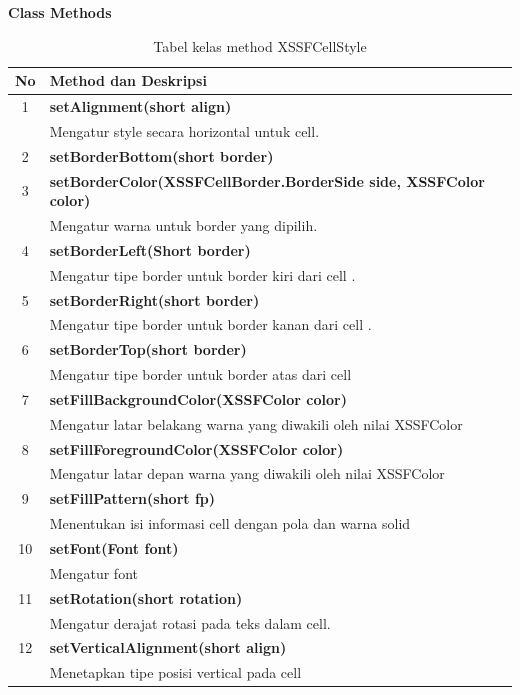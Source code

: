 \noindent \textbf{Class Methods}
\begin{table}[H]
		\centering
		\caption{Tabel kelas method XSSFCellStyle}
		\label{tab:methodXSSFCellStyle}
	\begin{tabular}{|c|p{12cm}|}
		\hline
		\textbf{No} & \textbf{Method dan Deskripsi} \\ \hline \hline
		1 & \textbf{setAlignment(short align)}\\
			&	Mengatur style secara horizontal untuk cell.\\ \hline 
		2 & \textbf{setBorderBottom(short border)}\\ \hline
		3 & \textbf{setBorderColor(XSSFCellBorder.BorderSide side, XSSFColor color)}\\
			&	Mengatur warna untuk border yang dipilih.\\ \hline
		4 & \textbf{setBorderLeft(Short border)}\\
			&	Mengatur tipe border untuk border kiri dari cell .\\ \hline	
		5 & \textbf{setBorderRight(short border)}\\
			&	Mengatur tipe border untuk border kanan dari cell .\\ \hline
		6 & \textbf{setBorderTop(short border)}\\
			&	Mengatur tipe border untuk border atas dari cell \\ \hline
		7 & \textbf{setFillBackgroundColor(XSSFColor color)}\\
			&	Mengatur latar belakang warna yang diwakili oleh nilai XSSFColor\\ \hline
		8 & \textbf{setFillForegroundColor(XSSFColor color)}\\
			&	Mengatur latar depan warna yang diwakili oleh nilai XSSFColor\\ \hline
		9 & \textbf{setFillPattern(short fp)}\\
			&	Menentukan isi informasi cell dengan pola dan warna solid\\ \hline
	  10 & \textbf{setFont(Font font)}\\
			 &	Mengatur font\\ \hline
		11 & \textbf{setRotation(short rotation)}\\
			 &	Mengatur derajat rotasi pada teks dalam cell.\\ \hline
		12 & \textbf{setVerticalAlignment(short align)}\\
			 &	Menetapkan tipe posisi vertical pada cell\\ \hline		
	\end{tabular}
\end{table}


